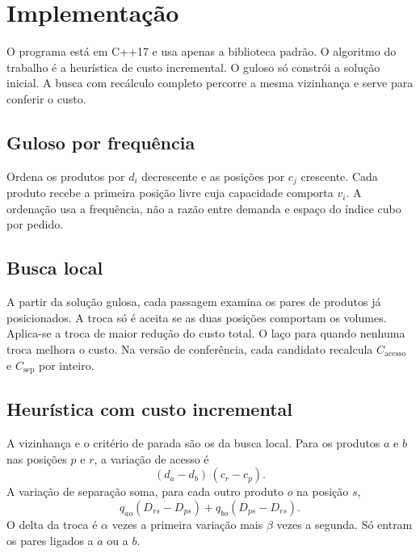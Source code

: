 \documentclass[conference,a4paper]{IEEEtran}
\begin{document}
\section{Implementação}
O programa está em C++17 e usa apenas a biblioteca padrão.
O algoritmo do trabalho é a heurística de custo incremental.
O guloso só constrói a solução inicial.
A busca com recálculo completo percorre a mesma vizinhança e serve para conferir o custo.

\subsection{Guloso por frequência}
Ordena os produtos por \(d_i\) decrescente e as posições por \(c_j\) crescente.
Cada produto recebe a primeira posição livre cuja capacidade comporta \(v_i\).
A ordenação usa a frequência, não a razão entre demanda e espaço do índice cubo por pedido.

\subsection{Busca local}
A partir da solução gulosa, cada passagem examina os pares de produtos já posicionados.
A troca só é aceita se as duas posições comportam os volumes.
Aplica-se a troca de maior redução do custo total.
O laço para quando nenhuma troca melhora o custo.
Na versão de conferência, cada candidato recalcula \(C_{\mathrm{acesso}}\) e \(C_{\mathrm{sep}}\) por inteiro.

\subsection{Heurística com custo incremental}
A vizinhança e o critério de parada são os da busca local.
Para os produtos \(a\) e \(b\) nas posições \(p\) e \(r\), a variação de acesso é
\begin{equation}
(d_a - d_b)\,(c_r - c_p).
\end{equation}
A variação de separação soma, para cada outro produto \(o\) na posição \(s\),
\begin{equation}
q_{ao}(D_{rs} - D_{ps}) + q_{bo}(D_{ps} - D_{rs}).
\end{equation}
O delta da troca é \(\alpha\) vezes a primeira variação mais \(\beta\) vezes a segunda.
Só entram os pares ligados a \(a\) ou a \(b\).
\end{document}
